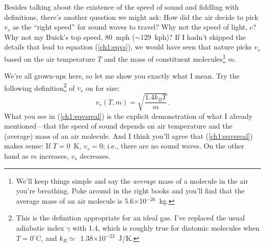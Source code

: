 Besides talking about the existence of the speed of sound and fiddling with
definitions, there's another question we might ask: How did the air decide to
pick $v_s$ as the ``right speed'' for sound waves to travel? Why not the speed
of light, $c$? Why not my Buick's top speed, 80~mph ($\sim$129~kph)? If I hadn't
skipped the details that lead to equation (\ref{ch1:eqvs}), we would have seen
that nature picks $v_s$ based on the air temperature $T$ and the mass of
constituent molecules\footnote{We'll keep things simple and say the
  \emph{average} mass of a molecule in the air you're breathing. Poke around in
  the right books and you'll find that the average mass of an air molecule is
  5.6$\times$10$^{-26}$~kg.} $m$.

We're all grown-ups here, so let me show you exactly what I mean. Try
the following definition\footnote{This is the definition appropriate for an
  ideal gas. I've replaced the usual adiabatic index $\gamma$ with 1.4, which is
  roughly true for diatomic molecules when $T = 0 ^{\circ}$C, and
  $k_B \simeq$~1.38$\times$10$^{-23}$~J/K.} of $v_s$ on for size:
\begin{equation}
  \label{ch1:eqvsreal}
  v_s (T,m) = \sqrt{\dfrac{1.4 k_B T}{m}}.
\end{equation}
What you see in (\ref{ch1:eqvsreal}) is the explicit demonstration of what I
already mentioned---that the speed of sound depends on air temperature and the
(average) mass of an air molecule. And I think you'll agree that
(\ref{ch1:eqvsreal}) makes sense: If $T = 0$~K, $v_s = 0$; i.e., there are no sound
waves. On the other hand as $m$ increases, $v_s$ decreases.

